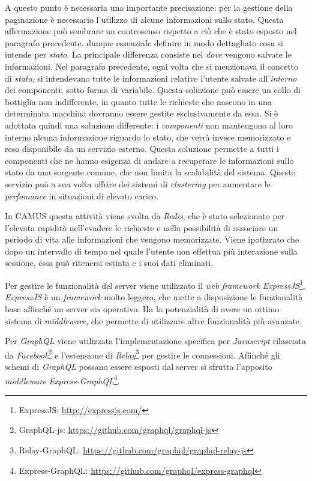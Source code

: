 A questo punto è necessaria una importante precisazione: per la gestione della paginazione è necessario l'utilizzo di alcune informazioni sullo stato. Questa affermazione può sembrare un controsenso rispetto a ciò che è stato esposto nel paragrafo precedente. \upe dunque essenziale definire in modo dettagliato cosa si intende per \emph{stato}. La principale differenza consiste nel \emph{dove} vengono salvate le informazioni. Nel paragrafo precedente, ogni volta che si menzionava il concetto di \emph{stato}, si intendevano tutte le informazioni relative l'utente salvate all'\emph{interno} dei componenti, sotto forma di variabile. Questa soluzione può essere un collo di bottiglia non indifferente, in quanto tutte le richieste che nascono in una determinata macchina dovranno essere gestite esclusivamente da essa. Si è adottata quindi una soluzione differente: i \emph{componenti} non mantengono al loro interno alcuna informazione riguardo lo stato, che verrà invece memorizzato e reso disponibile da un servizio esterno. Questa soluzione permette a tutti i componenti che ne hanno esigenza di andare a recuperare le informazioni sullo stato da una sorgente comune, che non limita la scalabilità del sistema. Questo servizio può a sua volta offrire dei sistemi di \emph{clustering} per aumentare le \emph{perfomance} in situazioni di elevato carico.

In CAMUS questa attività viene svolta da \emph{Redis}, che è stato selezionato per l'elevata rapidità nell'evadere le richieste e nella possibilità di associare un periodo di vita alle informazioni che vengono memorizzate. Viene ipotizzato che dopo un intervallo di tempo nel quale l'utente non effettua più interazione sulla sessione, essa può ritenersi estinta e i suoi dati eliminati.

Per gestire le funzionalità del server viene utilizzato il \emph{web framework} \emph{ExpressJS}\footnote{ExpressJS: \url{http://expressjs.com/}}. \emph{ExpressJS} è un \emph{framework} molto leggero, che mette a disposizione le funzionalità base affinché un server sia operativo. Ha la potenzialità di avere un ottimo sistema di \emph{middleware}, che permette di utilizzare altre funzionalità più avanzate.

Per \emph{GraphQL} viene utilizzata l'implementazione specifica per \emph{Javascript} rilasciata da \emph{Facebook}\footnote{GraphQL-js: \url{https://github.com/graphql/graphql-js}} e l'estensione di \emph{Relay}\footnote{Relay-GraphQL: \url{https://github.com/graphql/graphql-relay-js}} per gestire le connessioni. Affinché gli schemi di \emph{GraphQL} possano essere esposti dal server si sfrutta l'apposito \emph{middleware} \emph{Express-GraphQL}\footnote{Express-GraphQL: \url{https://github.com/graphql/express-graphql}}.

